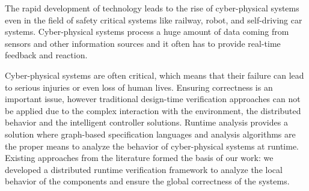 The rapid development of technology leads to the rise of cyber-physical systems even in the field of safety critical systems like railway, robot, and self-driving car systems. Cyber-physical systems process a huge amount of data coming from sensors and other information sources and it often has to provide real-time feedback and reaction.

Cyber-physical systems are often critical, which means that their failure can lead to serious injuries or even loss of human lives. Ensuring correctness is an important issue, however traditional design-time verification approaches can not be applied due to the complex interaction with the environment, the distributed behavior and the intelligent controller solutions. Runtime analysis provides a solution where graph-based specification languages and analysis algorithms are the proper means to analyze the behavior of cyber-physical systems at runtime. Existing approaches from the literature formed the basis of our work: we developed a distributed runtime verification framework to analyze the local behavior of the components and ensure the global correctness of the systems.


\vfill
\selectthesislanguage

\setcounter{romanPage}{\value{page}}
